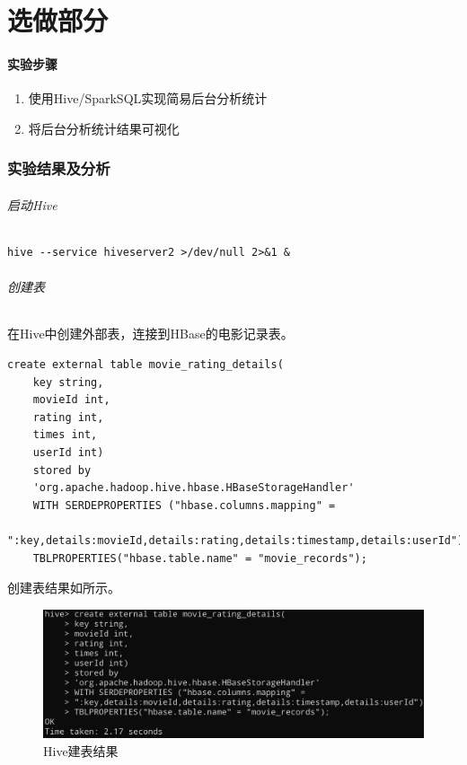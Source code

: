 \documentclass[lang=cn,11pt,a4paper,cite=authornum]{paper}
\begin{document}
\part{选做部分}

\subsection{实验步骤}

\begin{enumerate}
    \item 使用Hive/SparkSQL实现简易后台分析统计
    \item 将后台分析统计结果可视化
\end{enumerate}

\section{实验结果及分析}

\paragraph{启动Hive}

\begin{code}
\begin{verbatim}
hive --service hiveserver2 >/dev/null 2>&1 &
\end{verbatim}
\end{code}

\paragraph{创建表}

在Hive中创建外部表，连接到HBase的电影记录表。

\begin{code}
\begin{verbatim}
create external table movie_rating_details(
    key string,
    movieId int,
    rating int,
    times int,
    userId int)
    stored by
    'org.apache.hadoop.hive.hbase.HBaseStorageHandler'
    WITH SERDEPROPERTIES ("hbase.columns.mapping" =
    ":key,details:movieId,details:rating,details:timestamp,details:userId")
    TBLPROPERTIES("hbase.table.name" = "movie_records");
\end{verbatim}
\end{code}

创建表结果如所示。

\begin{figure}[!htb]
    \centering
    \includegraphics[width=\textwidth]{./images/4.jpg}
    \caption{Hive建表结果\label{fig:4}}
\end{figure}
\end{document}
